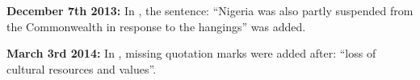 \documentclass[10pt]{article}
\begin{document}
\textbf{December 7th 2013:} In , the sentence: ``Nigeria was also partly suspended from the Commonwealth in response to the hangings'' was added.

\textbf{March 3rd 2014:} In , missing quotation marks were added after: ``loss of cultural resources and values''.


\end{document}
